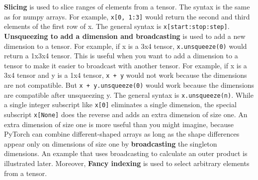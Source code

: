 \textbf{Slicing} is used to slice ranges of elements from a tensor.  The syntax is the same as for numpy arrays.  For example, \texttt{x[0, 1:3]} would return the second and third elements of the first row of x. The general syntax is \texttt{x[start:stop:step]}.
\textbf{Unsqueezing to add a dimension and broadcasting} is used to add a new dimension to a tensor.  For example, if x is a 3x4 tensor, \texttt{x.unsqueeze(0)} would return a 1x3x4 tensor.  This is useful when you want to add a dimension to a tensor to make it easier to broadcast with another tensor.  For example, if x is a 3x4 tensor and y is a 1x4 tensor, \texttt{x + y} would not work because the dimensions are not compatible.  But \texttt{x + y.unsqueeze(0)} would work because the dimensions are compatible after unsqueezing y.  The general syntax is \texttt{x.unsqueeze(n)}.
While a single integer subscript like \texttt{x[0]} eliminates a single dimension, the special subscript \texttt{x[None]} does the reverse and adds an extra dimension of size one. 
An extra dimension of size one is more useful than you might imagine, because PyTorch can combine different-shaped arrays as long as the shape differences appear only on dimensions of size one by \textbf{broadcasting} the singleton dimensions. An example that uses broadcasting to calculate an outer product is illustrated later. 
Moreover, \textbf{Fancy indexing} is used to select arbitrary elements from a tensor.  

